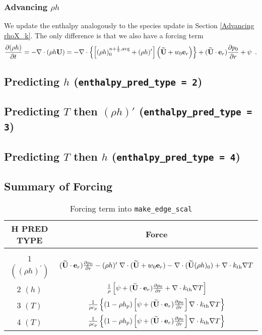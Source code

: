 \subsubsection{Advancing $\rho h$}
We update the enthalpy analogously to the species update in 
Section \ref{Advancing rhoX_k}.  The only difference is that we also 
have a forcing term
\begin{equation}
\frac{\partial(\rho h)}{\partial t} = -\nabla\cdot(\rho h{\bf U}) = 
-\nabla\cdot\left\{\left[(\rho h)_0^{n+\frac{1}{2},{\rm avg}} 
+ (\rho h)'\right]\left(\widetilde{{\bf U}} + w_0{\bf e}_r\right)\right\} + (\widetilde{{\bf U}} \cdot \mathbf{e}_r)\frac{\partial p_0}{\partial r} + \psi  \enskip .
\end{equation}

\subsection{Predicting $h$ ({\tt enthalpy\_pred\_type = 2})}

\subsection{Predicting $T$ then $(\rho h)'$ ({\tt enthalpy\_pred\_type = 3})}

\subsection{Predicting $T$ then $h$ ({\tt enthalpy\_pred\_type = 4})}

\subsection{Summary of Forcing}

\begin{table*}[h]
\begin{center}
\caption{Forcing term into {\tt make\_edge\_scal} \newline}
\begin{tabular}{c|c}
\hline
\hline
{H PRED TYPE} &   {Force} \\
\hline \\[-3mm]
1  $((\rho h)^\prime)$ &  $(\widetilde{{\bf U}} \cdot \mathbf{e}_r) \frac{\partial p_0}{\partial r} - 
 (\rho h)^\prime \; \nabla \cdot (\widetilde{{\bf U}}+w_0 \mathbf{e}_r) - 
 \nabla \cdot (\widetilde{{\bf U}} (\rho h)_0) + \nabla \cdot k_{\rm th} \nabla T$ \\[2 mm]
2  $(h)$ & $\frac{1}{\rho} \left [\psi + (\widetilde{{\bf U}} \cdot \mathbf{e}_r)
  \frac{\partial p_0}{\partial r} + \nabla \cdot k_{\rm th} \nabla T \right ]$ \\[2 mm]
3  $(T)$ & $\frac{1}{\rho c_p} \left \{ (1 - \rho h_p) 
   \left [\psi + (\widetilde{{\bf U}} \cdot \mathbf{e}_r) \frac{\partial p_0}{\partial r} \right ] \nabla \cdot k_{\rm th} \nabla T \right \}$ \\[2 mm]
4  $(T)$ & $\frac{1}{\rho c_p} \left\{ (1 - \rho h_p) \left [\psi + (\widetilde{{\bf U}} \cdot \mathbf{e}_r)
\frac{\partial p_0}{\partial r}\right ] \nabla \cdot k_{\rm th} \nabla T \right\}$ \\[2 mm]
\hline
\end{tabular}
\end{center}
\end{table*}

